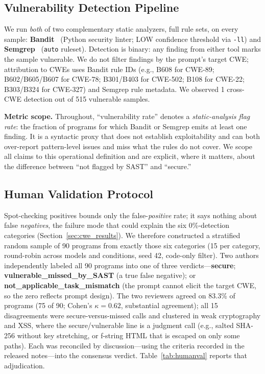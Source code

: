 \documentclass[sigconf,review,anonymous]{acmart}
\begin{document}
\subsection{Vulnerability Detection Pipeline}

We run \emph{both} of two complementary static analyzers, full rule sets, on every sample: \textbf{Bandit}~\cite{bandit} (Python security linter; LOW confidence threshold via \texttt{-ll}) and \textbf{Semgrep}~\cite{semgrep} (\texttt{auto} ruleset). Detection is binary: any finding from either tool marks the sample vulnerable. We do not filter findings by the prompt's target CWE; attribution to CWEs uses Bandit rule IDs (e.g., B608 for CWE-89; B602/B605/B607 for CWE-78; B301/B403 for CWE-502; B108 for CWE-22; B303/B324 for CWE-327) and Semgrep rule metadata. We observed 1 cross-CWE detection out of 515 vulnerable samples.

\textbf{Metric scope.} Throughout, ``vulnerability rate'' denotes a \emph{static-analysis flag rate}: the fraction of programs for which Bandit or Semgrep emits at least one finding. It is a syntactic proxy that does not establish exploitability and can both over-report pattern-level issues and miss what the rules do not cover. We scope all claims to this operational definition and are explicit, where it matters, about the difference between ``not flagged by SAST'' and ``secure.''

\subsection{Human Validation Protocol}
\label{sec:humanval}

Spot-checking positives bounds only the false-\emph{positive} rate; it says nothing about false \emph{negatives}, the failure mode that could explain the six 0\%-detection categories (Section~\ref{sec:cwe_results}). We therefore constructed a stratified random sample of 90 programs from exactly those six categories (15 per category, round-robin across models and conditions, seed 42, code-only filter). Two authors independently labeled all 90 programs into one of three verdicts---\textbf{secure}; \textbf{vulnerable\_missed\_by\_SAST} (a true false negative); or \textbf{not\_applicable\_task\_mismatch} (the prompt cannot elicit the target CWE, so the zero reflects prompt design). The two reviewers agreed on 83.3\% of programs (75 of 90; Cohen's $\kappa = 0.62$, substantial agreement); all 15 disagreements were secure-versus-missed calls and clustered in weak cryptography and XSS, where the secure/vulnerable line is a judgment call (e.g., salted SHA-256 without key stretching, or f-string HTML that is escaped on only some paths). Each was reconciled by discussion---using the criteria recorded in the released notes---into the consensus verdict. Table~\ref{tab:humanval} reports that adjudication.
\end{document}
